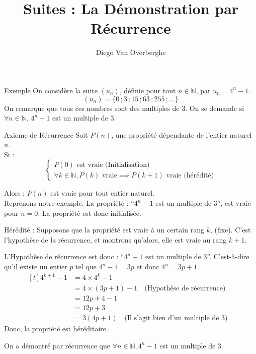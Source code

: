 \documentclass{cours}
\title{Suites : La Démonstration par Récurrence}
\author{Diego Van Overberghe}
\begin{document}

    \begin{Gpartie}{Exemple}
        On considère la suite $\left(u_n\right)$, définie pour tout $n\in\mathbb{N}$, par $u_n=4^n-1$.
            \[\left(u_n\right)=\big\{0\,;3\,;15\,;63\,;255\,;\dotsc\big\}\]
        On remarque que tous ces nombres sont des multiples de 3. On se demande si $\forall n\in\mathbb{N}$, $4^n-1$ est un multiple de 3.
    \end{Gpartie}
    \begin{Gpartie}{Axiome de Récurrence}
        Soit $P(n)$, une propriété dépendante de l'entier naturel $n$.\\
        Si :
        \[\begin{cases}
            P(0)\text{ est vraie (Initialisation)} \\ \forall k\in\mathbb{N}, P(k)\text{ vraie}\implies P(k+1)\text{ vraie (hérédité)}
        \end{cases}\]

        Alors : $P(n)$ est vraie pour tout entier naturel. \\[4ex]
        Reprenons notre exemple. La propriété : ``$4^n-1$ est un multiple de 3'', est vraie pour $n=0$. La propriété est donc initialisée.
        
        Hérédité : Supposons que la propriété est vraie à un certain rang $k$, (fixe). C'est l'hypothèse de la récurrence, et montrons qu'alors, elle est vraie au rang $k+1$.
        
        L'Hypothèse de récurrence est donc : ``$4^n-1$ est un multiple de 3''. C'est-à-dire qu'il existe un entier $p$ tel que $4^n-1=3p$ et donc $4^n=3p+1$.
        \[\begin{aligned}[t]
            4^{k+1}-1&=4\times 4^k-1 &\\
            &= 4\times\left(3p+1\right)-1 \quad \text{(Hypothèse de récurrence)} &\\
            &=12p+4-1 &\\
            &=12p+3 &\\
            &=3\left(4p+1\right) \quad \text{(Il s'agit bien d'un multiple de 3)}
        \end{aligned}\]
        Donc, la propriété est héréditaire.

        On a démontré par récurrence que $\forall n\in\mathbb{N},4^n-1$ est un multiple de 3.
    \end{Gpartie}
\end{document}
